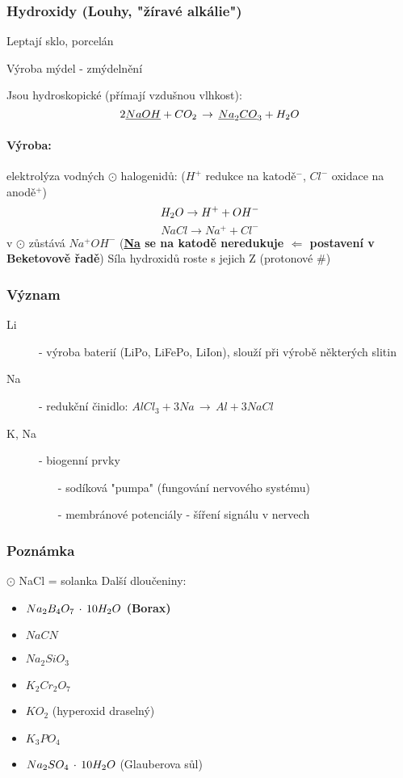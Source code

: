     \newpage
    \subsubsection{Hydroxidy (Louhy, "žíravé alkálie")}
        Leptají sklo, porcelán

        Výroba mýdel - zmýdelnění

        Jsou hydroskopické (přímají vzdušnou vlhkost):\[2\underline{NaOH} + CO_2\,\to\,\underline{Na}_2\underline{CO}_3 + H_2O \]
        \paragraph*{Výroba:}
            elektrolýza vodných $\odot$ halogenidů: ($H^+$ redukce na katodě$^-$, $Cl^-$ oxidace na anodě$^+$)
            \[H_2O \to H ^+ + OH^-\]
            \[NaCl \to Na^+ + Cl^-\]
            v $\odot$ zůstává $Na^+OH^-$ (\textbf{\underline{Na} se na katodě neredukuje $\Longleftarrow $ postavení v Beketovově řadě})
            Síla hydroxidů roste s jejich Z (protonové \#)
    \subsubsection{Význam}
        \begin{description}
            \item[Li] - výroba baterií (LiPo, LiFePo, LiIon), slouží při výrobě některých slitin
            \item[Na] - redukční činidlo: \(AlCl_3 + 3Na\,\to\,Al+3NaCl\)
            \item[K, Na] - biogenní prvky \begin{itemize}
                \item[-] sodíková "pumpa" (fungování nervového systému)
                \item[-] membránové potenciály - šíření signálu v nervech
            \end{itemize}
        \end{description}
    \subsubsection*{Poznámka}
    $\odot$ NaCl = solanka
    \newline
    \newline
    Další dloučeniny:
    \begin{itemize}
        \item \textbf{$ Na _2 B _4 O _7 \, \cdot \, 10 H_2O$ (Borax)}
        \item $NaCN$
        \item $Na_2SiO_3$
        \item $K _2 Cr _2 O _7$
        \item $K O _2$ (hyperoxid draselný)
        \item $K _3 P O _4$
        \item $Na _2 SO _4 \, \cdot \, 10 H_2O$ (Glauberova sůl)
    \end{itemize}


